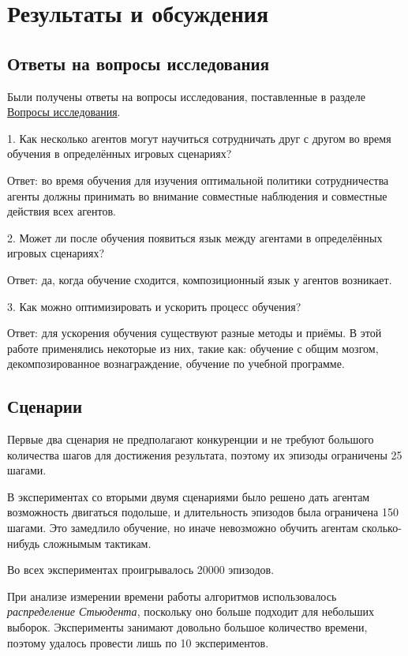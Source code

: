 \chapter{Результаты и обсуждения}


\section{Ответы на вопросы исследования}

Были получены ответы на вопросы исследования, поставленные в разделе \hyperref[intro-questions]{Вопросы исследования}.

1. Как несколько агентов могут научиться сотрудничать друг с другом во время обучения в определённых игровых сценариях?

Ответ: во время обучения для изучения оптимальной политики сотрудничества агенты должны принимать во внимание совместные наблюдения и совместные действия всех агентов.

2. Может ли после обучения появиться язык между агентами в определённых игровых сценариях?

Ответ: да, когда обучение сходится, композиционный язык у агентов возникает.

3. Как можно оптимизировать и ускорить процесс обучения?

Ответ: для ускорения обучения существуют разные методы и приёмы. В этой работе применялись некоторые из них, такие как: обучение с общим мозгом, декомпозированное вознаграждение, обучение по учебной программе.

\section{Сценарии}

Первые два сценария не предполагают конкуренции и не требуют большого количества шагов для достижения результата, поэтому их эпизоды ограничены 25 шагами.

В экспериментах со вторыми двумя сценариями было решено дать агентам возможность двигаться подольше, и длительность эпизодов была ограничена 150 шагами. Это замедлило обучение, но иначе невозможно обучить агентам сколько-нибудь сложнымым тактикам.

Во всех экспериментах проигрывалось 20000 эпизодов.

При анализе измерении времени работы алгоритмов использовалось \textit{распределение Стьюдента}, поскольку оно больше подходит для небольших выборок. Эксперименты занимают довольно большое количество времени, поэтому удалось провести лишь по 10 экспериментов.

